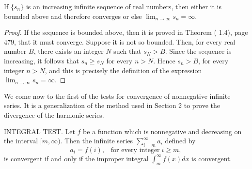 \begin{theorem} %
If $\{ s_n \}$ is an increasing infinite sequence of real numbers, then either it is bounded above and therefore converges or else $\lim_{n \rightarrow \infty} s_n = \infty$.
\end{theorem}

\begin{proof}
If the sequence is bounded above, then it is proved in Theorem ( 1.4), page 479, that it must converge. Suppose it is not so bounded. Then, for every real number $B$, there exists an integer $N$ such that $s_N > B$. Since the sequence is increasing, it follows that $s_n \geq s_N$ for every $n > N$. Hence $s_n > B$, for every integer $n > N$, and this is precisely the definition of the expression $\lim_{n \rightarrow \infty} s_n = \infty$.
\end{proof}

We come now to the first of the tests for convergence of nonnegative infinite series. It is a generalization of the method used in Section 2 to prove the divergence of the harmonic series.

\begin{theorem} %
INTEGRAL TEST. Let $f$ be a function which is nonnegative and decreasing on the interval $[m, \infty)$. Then the infinite series $\sum_{i=m}^{\infty} a_i$ defined by
$$
a_i = f(i), \;\;\;\mbox{for every integer}\; i \geq m, 
$$
\noindent is convergent if and only if the improper integral $\int_m^\infty f(x) dx$ is convergent.
\end{theorem}



